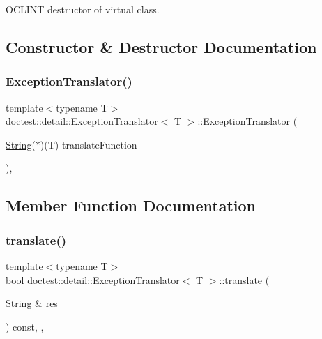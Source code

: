 O\+C\+L\+I\+NT destructor of virtual class. 

\subsection{Constructor \& Destructor Documentation}
\mbox{\label{classdoctest_1_1detail_1_1ExceptionTranslator_a3ac05488993c40c6ba55ce51a6bf7eae}} 
\subsubsection{\texorpdfstring{Exception\+Translator()}{ExceptionTranslator()}}
{\footnotesize\ttfamily template$<$typename T$>$ \\
\hyperlink{classdoctest_1_1detail_1_1ExceptionTranslator}{doctest\+::detail\+::\+Exception\+Translator}$<$ T $>$\+::\hyperlink{classdoctest_1_1detail_1_1ExceptionTranslator}{Exception\+Translator} (\begin{DoxyParamCaption}\item[{\hyperlink{classdoctest_1_1String}{String}($\ast$)(T)}]{translate\+Function }\end{DoxyParamCaption})\hspace{0.3cm}{\ttfamily [inline]}, {\ttfamily [explicit]}}



\subsection{Member Function Documentation}
\mbox{\label{classdoctest_1_1detail_1_1ExceptionTranslator_a56484c4218a06bbbd1548335a8b64110}} 
\subsubsection{\texorpdfstring{translate()}{translate()}}
{\footnotesize\ttfamily template$<$typename T$>$ \\
bool \hyperlink{classdoctest_1_1detail_1_1ExceptionTranslator}{doctest\+::detail\+::\+Exception\+Translator}$<$ T $>$\+::translate (\begin{DoxyParamCaption}\item[{\hyperlink{classdoctest_1_1String}{String} \&}]{res }\end{DoxyParamCaption}) const\hspace{0.3cm}{\ttfamily [inline]}, {\ttfamily [override]}, {\ttfamily [virtual]}}



